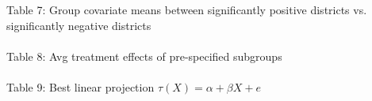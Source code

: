 \documentclass{article} %
\begin{document}
Table 7: Group covariate means between significantly positive districts vs. significantly negative districts\\
\\


Table 8: Avg treatment effects of pre-specified subgroups\\
\\

Table 9: Best linear projection $\tau(X) = \alpha + \beta X + e$\\
\\



	
	

	
	

	
	
	 
	

	
	
	


	




	 

 
\end{document}
